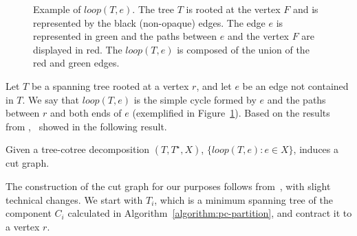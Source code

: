 \begin{figure}[H]
    \centering
{}
    \caption{Example of \(loop(T, e)\). The tree \(T\) is rooted at the vertex \(F\) and is represented by the black (non-opaque) edges. The edge \(e\) is represented in green and the paths between \(e\) and the vertex \(F\) are displayed in red. The \(loop(T, e)\) is composed of the union of the red and green edges.}
    \label{fig:loop_T_e}
\end{figure}


Let \(T\) be a spanning tree rooted at a vertex \(r\), and let \(e\) be an edge not contained in \(T\). We say that \(loop(T, e)\) is the simple cycle formed by \(e\) and the paths between \(r\) and both ends of \(e\) (exemplified in Figure~\ref{fig:loop_T_e}). Based on the results from \citeauthor{Eppstein},~\cite{Borradaile2012} showed in the following result.

\begin{flemma}
    Given a tree-cotree decomposition \((T, T^{\star}, X)\), \(\{loop(T, e): e \in X\}\), induces a cut graph.
\end{flemma}

The construction of the cut graph for our purposes follows from~\cite{Borradaile2012}, with slight technical changes. We start with \(T_i\), which is a minimum spanning tree of the component \(C_i\) calculated in Algorithm~\ref{algorithm:pc-partition}, and contract it to a vertex \(r\).

